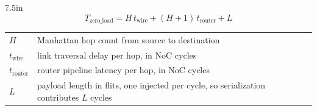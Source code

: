 \documentclass[border=8pt]{standalone}
\begin{document}
\begin{varwidth}{7.5in}
\[
  T_{\mathrm{zero\_load}} = H\, t_{\mathrm{wire}} + (H{+}1)\, t_{\mathrm{router}} + L
\]
\begin{tabular}{@{}ll@{}}
  $H$                   & Manhattan hop count from source to destination\\
  $t_{\mathrm{wire}}$   & link traversal delay per hop, in NoC cycles\\
  $t_{\mathrm{router}}$ & router pipeline latency per hop, in NoC cycles\\
  $L$                   & payload length in flits, one injected per cycle,
                          so serialization contributes $L$ cycles\\
\end{tabular}
\end{varwidth}
\end{document}
